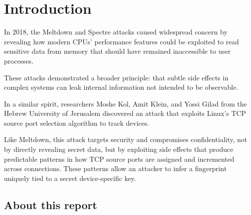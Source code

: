 \documentclass{report}
\begin{document}
\fontsize{8pt}{9pt}\selectfont
{}



\tableofcontents
\thispagestyle{empty}
\clearpage
\pagestyle{plain}

\listoffigures

\clearpage
{}
\pagestyle{default}

\chapter{Introduction}
\label{sec:introduction}

In 2018, the \alert{Meltdown} and \alert{Spectre} attacks caused widespread concern by revealing how modern CPUs’ performance features could be exploited to read sensitive data from memory that should have remained inaccessible to user processes.

These attacks demonstrated a broader principle: that subtle side effects in complex systems can leak internal information not intended to be observable.

In a similar spirit, researchers Moshe Kol, Amit Klein, and Yossi Gilad from the Hebrew University of Jerusalem discovered an attack that exploits Linux’s \alert{TCP source port selection algorithm} to track devices.

Like Meltdown, this attack targets \alert{security} and compromises confidentiality, not by directly revealing secret data, but by exploiting side effects that produce predictable patterns in how TCP source ports are assigned and incremented across connections. These patterns allow an attacker to infer a fingerprint uniquely tied to a \alert{secret device-specific key}.

\section{About this report}
\label{sec:goal_of_this_report}
\end{document}
